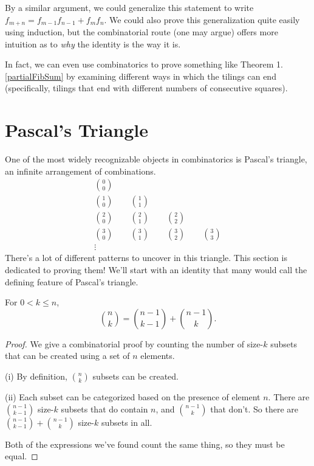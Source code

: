 \documentclass[../m055main.tex]{subfiles}
\begin{document}
By a similar argument, we could generalize this statement to write $f_{m+n} = f_{m-1} f_{n-1} + f_m f_n$.
We could also prove this generalization quite easily using induction, but the combinatorial route (one may argue) offers more intuition as to \textit{why} the identity is the way it is.

In fact, we can even use combinatorics to prove something like Theorem 1.\ref{partialFibSum} by examining different ways in which the tilings can end (specifically, tilings that end with different numbers of consecutive squares).

\section{Pascal's Triangle}
One of the most widely recognizable objects in combinatorics is Pascal's triangle, an infinite arrangement of combinations.
\begin{gather*}
    {0 \choose 0} \\
    {1 \choose 0} \qquad {1 \choose 1} \\
    {2 \choose 0} \qquad {2 \choose 1} \qquad {2 \choose 2} \\
    {3 \choose 0} \qquad {3 \choose 1} \qquad {3 \choose 2} \qquad {3 \choose 3} \\
    \vdots
\end{gather*}
There's a lot of different patterns to uncover in this triangle.
This section is dedicated to proving them!
We'll start with an identity that many would call the defining feature of Pascal's triangle.

\begin{theorem}
    For $0 < k \leq n$,
    \[ {n \choose k} = {n-1 \choose k-1} + {n-1 \choose k}. \]
\end{theorem}

\begin{proof}
    We give a combinatorial proof by counting the number of size-$k$ subsets that can be created using a set of $n$ elements.
    \smallskip

    (i) By definition, ${n \choose k}$ subsets can be created.
    \smallskip

    (ii) Each subset can be categorized based on the presence of element $n$.
    There are ${n-1 \choose k-1}$ size-$k$ subsets that do contain $n$, and ${n-1 \choose k}$ that don't.
    So there are ${n-1 \choose k-1} + {n-1 \choose k}$ size-$k$ subsets in all.
    \smallskip

    Both of the expressions we've found count the same thing, so they must be equal.
\end{proof}
\end{document}
